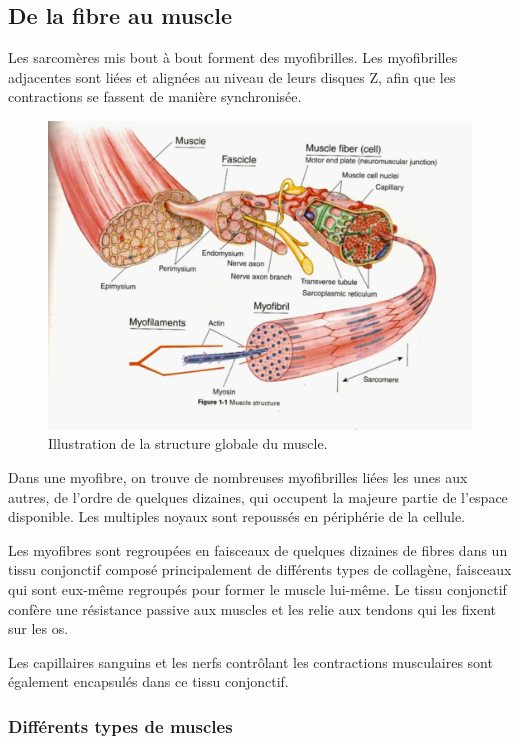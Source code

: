 \documentclass{report}
\begin{document}
\subsection{De la fibre au muscle}

Les sarcomères mis bout à bout  forment des myofibrilles. Les myofibrilles adjacentes sont liées et alignées au niveau de leurs disques Z, afin que les contractions se fassent de manière synchronisée. 

\begin{figure}
\includegraphics[scale=0.5]{Figures/12_29_0.png} 
 \caption{Illustration de la structure globale du muscle.}
\end{figure}

Dans une myofibre, on trouve de nombreuses myofibrilles liées les unes aux autres, de l'ordre de quelques dizaines, qui occupent la majeure partie de l'espace disponible. Les multiples noyaux sont repoussés en périphérie de la cellule. 

Les myofibres sont regroupées en faisceaux de quelques dizaines de fibres dans un tissu conjonctif composé principalement de différents types de collagène, faisceaux qui sont eux-même regroupés pour former le muscle lui-même. Le tissu conjonctif confère une résistance passive aux muscles et les relie aux tendons qui les fixent sur les os. 

Les capillaires sanguins et les nerfs contrôlant les contractions musculaires sont également encapsulés dans ce tissu conjonctif. 
\subsubsection{Différents types de muscles}
\end{document}
